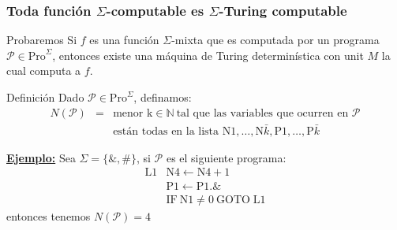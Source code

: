 \begin{frame}
	\frametitle{Toda función $\Sigma$-computable es $\Sigma$-Turing computable}

	\begin{alertblock}{Probaremos}
		\PN Si $f$ es una función $\Sigma$-mixta que es computada por un programa $\mathcal{P} \in
		\mathrm{Pro}^{\Sigma}$, entonces existe una máquina de Turing determinística con unit $M$ la cual computa a $f$.
	\end{alertblock}

	\begin{block}{Definición}
		\PN Dado $\mathcal{P} \in \mathrm{Pro}^{\Sigma}$, definamos:
		\begin{eqnarray*}
			N(\mathcal{P}) &=& \text{menor k} \in \mathbb{N}\ \text{tal que las variables que ocurren en } \mathcal{P} \\
			&& \text{están todas en la lista N}1, \dotsc, \mathrm{N}\bar{k}, \mathrm{P}1, \dotsc, \mathrm{P}\bar{k}
		\end{eqnarray*}
	\end{block}

	\PN \underline{\textbf{Ejemplo:}} Sea $\Sigma = \{\&,\#\}$, si $\mathcal{P}$ es el siguiente programa:
	\begin{equation*}
		\begin{array}{ll}
			\mathrm{L}1 & \mathrm{N}4\leftarrow \mathrm{N}4+1 \\
			& \mathrm{P}1\leftarrow \mathrm{P}1.\& \\
			& \mathrm{IF\ N}1\neq 0\ \mathrm{GOTO}\;\mathrm{L}1
		\end{array}
	\end{equation*}
	\PN entonces tenemos $N(\mathcal{P})=4$
\end{frame}
